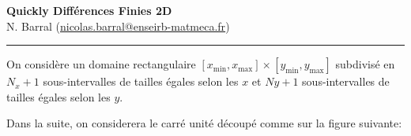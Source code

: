 \documentclass[11pt]{article}
\begin{document}
\begin{center}
{\bf \Large Quickly Différences Finies 2D } \\ 
N. Barral (\href{mailto:nicolas.barral@enseirb-matmeca.fr}{nicolas.barral@enseirb-matmeca.fr})
\end{center}
\hrule
\vspace*{1cm}


On considère un domaine rectangulaire $[x_{\min}, x_{\max}]\times[y_{\min}, y_{\max}]$ subdivisé en $N_x+1$ sous-intervalles de tailles égales selon les $x$ et $Ny+1$ sous-intervalles de tailles égales selon les $y$.

Dans la suite, on considerera le carré unité découpé comme sur la figure suivante:

\begin{figure}[!ht]
\center
\begin{tikzpicture}[scale=1, , every node/.style={transform shape},
vertex/.style={circle, draw, fill, color=black, inner sep=1.5pt}]


\end{tikzpicture}
\end{figure}
\end{document}
